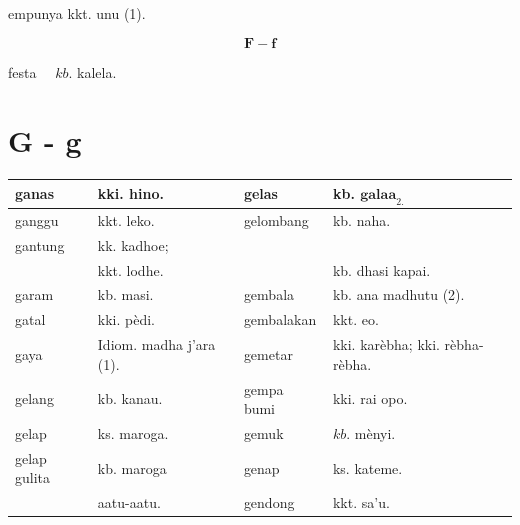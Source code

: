 \documentclass[10pt]{article}
\begin{document}
empunya kkt. unu (1).

\[
\mathbf{F}-\mathbf{f}
\]

festa \(\quad k b\). kalela.

\section*{G - g}
\begin{center}
\begin{tabular}{|l|l|l|l|}
\hline
ganas & kki. hino. & gelas & kb. \(\mathbf{g a l a a}_{2 .}\) \\
\hline
ganggu & kkt. leko. & gelombang & kb. naha. \\
\hline
gantung & kk. kadhoe; & \multirow{2}{*}{} &  \\
\hline
 & kkt. lodhe. &  & kb. dhasi kapai. \\
\hline
garam & kb. masi. & gembala & kb. ana madhutu (2). \\
\hline
gatal & kki. pèdi. & gembalakan & kkt. eo. \\
\hline
gaya & Idiom. madha j'ara (1). & gemetar & kki. karèbha; kki. rèbha-rèbha. \\
\hline
gelang & kb. kanau. & gempa bumi & kki. rai opo. \\
\hline
gelap & ks. maroga. & gemuk & \(k b\). mènyi. \\
\hline
gelap gulita & kb. maroga & genap & ks. kateme. \\
\hline
 & aatu-aatu. & gendong & kkt. sa'u. \\
\hline
\end{tabular}
\end{center}
\end{document}
